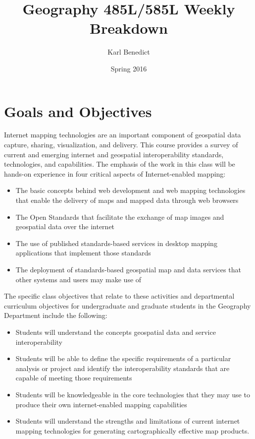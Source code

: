 \documentclass[]{book}
\title{Geography 485L/585L Weekly Breakdown}
\author{Karl Benedict}
\date{Spring 2016}
\begin{document}
\maketitle

{
\hypersetup{linkcolor=black}
\setcounter{tocdepth}{2}
\tableofcontents
}
\chapter{Goals and Objectives}\label{goals}

Internet mapping technologies are an important component of geospatial
data capture, sharing, visualization, and delivery. This course provides
a survey of current and emerging internet and geospatial
interoperability standards, technologies, and capabilities. The emphasis
of the work in this class will be hands-on experience in four critical
aspects of Internet-enabled mapping:

\begin{itemize}
\item
  The basic concepts behind web development and web mapping technologies
  that enable the delivery of maps and mapped data through web browsers
\item
  The Open Standards that facilitate the exchange of map images and
  geospatial data over the internet
\item
  The use of published standards-based services in desktop mapping
  applications that implement those standards
\item
  The deployment of standards-based geospatial map and data services
  that other systems and users may make use of
\end{itemize}

The specific class objectives that relate to these activities and
departmental curriculum objectives for undergraduate and graduate
students in the Geography Department include the following:

\begin{itemize}
\item
  Students will understand the concepts geospatial data and service
  interoperability
\item
  Students will be able to define the specific requirements of a
  particular analysis or project and identify the interoperability
  standards that are capable of meeting those requirements
\item
  Students will be knowledgeable in the core technologies that they may
  use to produce their own internet-enabled mapping capabilities
\item
  Students will understand the strengths and limitations of current
  internet mapping technologies for generating cartographically
  effective map products.
\end{itemize}
\end{document}
